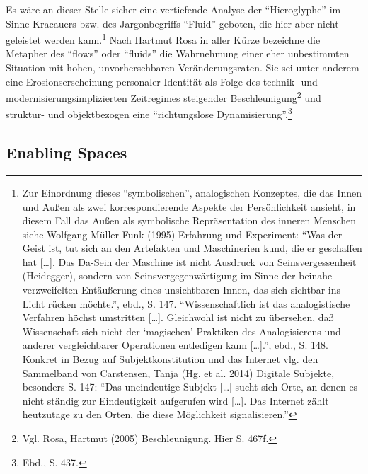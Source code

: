 \documentclass[a4paper,
fontsize=11pt,
oneside,
numbers=noperiodatend,
parskip=half-,
bibliography=totoc,
final
]{scrartcl}
\begin{document}
Es wäre an dieser Stelle sicher eine vertiefende Analyse der
\enquote{Hieroglyphe} im Sinne Kracauers bzw. des Jargonbegriffs
\enquote{Fluid} geboten, die hier aber nicht geleistet werden
kann.\footnote{Zur Einordnung dieses \enquote{symbolischen},
  analogischen Konzeptes, die das Innen und Außen als zwei
  korrespondierende Aspekte der Persönlichkeit ansieht, in diesem Fall
  das Außen als symbolische Repräsentation des inneren Menschen siehe
  Wolfgang Müller-Funk (1995) Erfahrung und Experiment: \enquote{Was der
  Geist ist, tut sich an den Artefakten und Maschinerien kund, die er
  geschaffen hat {[}\ldots{}{]}. Das Da-Sein der Maschine ist nicht
  Ausdruck von Seinsvergessenheit (Heidegger), sondern von
  Seinsvergegenwärtigung im Sinne der beinahe verzweifelten Entäußerung
  eines unsichtbaren Innen, das sich sichtbar ins Licht rücken möchte.},
  ebd., S. 147. \enquote{Wissenschaftlich ist das analogistische
  Verfahren höchst umstritten {[}\ldots{}{]}. Gleichwohl ist nicht zu
  übersehen, daß Wissenschaft sich nicht der \enquote{magischen}
  Praktiken des Analogisierens und anderer vergleichbarer Operationen
  entledigen kann {[}\ldots{}{]}.}, ebd., S. 148. Konkret in Bezug auf
  Subjektkonstitution und das Internet vlg. den Sammelband von
  Carstensen, Tanja (Hg. et al. 2014) Digitale Subjekte, besonders S.
  147: \enquote{Das uneindeutige Subjekt {[}\ldots{}{]} sucht sich Orte,
  an denen es nicht ständig zur Eindeutigkeit aufgerufen wird
  {[}\ldots{}{]}. Das Internet zählt heutzutage zu den Orten, die diese
  Möglichkeit signalisieren.}} Nach Hartmut Rosa in aller Kürze
bezeichne die Metapher des \enquote{flows} oder \enquote{fluids} die
Wahrnehmung einer eher unbestimmten Situation mit hohen,
unvorhersehbaren Veränderungsraten. Sie sei unter anderem eine
Erosionserscheinung personaler Identität als Folge des technik- und
modernisierungsimplizierten Zeitregimes steigender
Beschleunigung\footnote{Vgl. Rosa, Hartmut (2005) Beschleunigung. Hier
  S. 467f.} und struktur- und objektbezogen eine \enquote{richtungslose
Dynamisierung}.\footnote{Ebd., S. 437.}

\subsection*{Enabling Spaces}\label{enabling-spaces}
\end{document}
